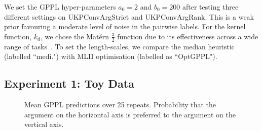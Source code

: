 We set the GPPL hyper-parameters $a_0=2$ and $b_0=200$ after
testing three different settings on UKPConvArgStrict and UKPConvArgRank.
This is a weak prior favouring a moderate level of noise in the pairwise labels.
For the kernel function, $k_d$, we chose the Mat\'ern $\frac{3}{2}$ function due to its 
effectiveness across a wide range of tasks~\cite{rasmussen_gaussian_2006}.
To set the length-scales, we compare the median heuristic (labelled ``medi.")
with MLII optimisation (labelled as ``OptGPPL").

\subsection{Experiment 1: Toy Data}

\begin{figure}
\centering
{}
\caption{Mean GPPL predictions over 25 repeats. Probability that the argument 
on the horizontal axis is preferred to the argument on the vertical axis.}
\label{fig:gppl_classification}
\end{figure}
